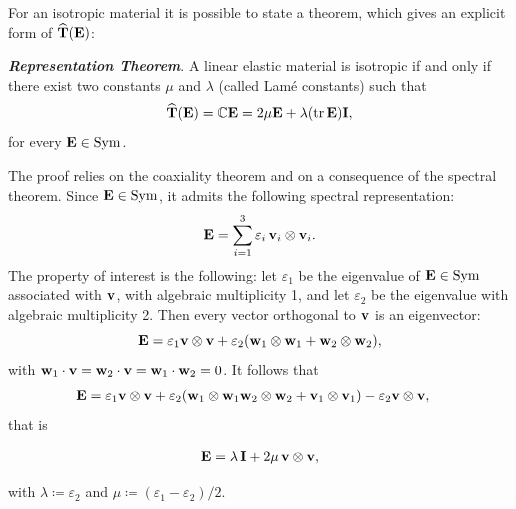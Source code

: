 For an isotropic material it is possible to state a theorem, which gives an explicit form of $\widehat{\mathbf{T}}(\mathbf{E})$:
\begin{definition}
 \textit{\textbf{Representation Theorem}}.	A linear elastic material is isotropic if and only if there exist two constants $\mu$ and $\lambda$ (called Lamé constants) such that
	\begin{equation}
		\widehat{\mathbf{T}}(\mathbf{E})=\mathbb{C} \mathbf{E} =2 \mu \mathbf{E} +\lambda(\operatorname{tr} \mathbf{E} )\mathbf{I},
	\end{equation}
	for every $\mathbf{E}\in\operatorname{Sym}$.
\end{definition}

The proof relies on the coaxiality theorem and on a consequence of the spectral theorem. Since $\mathbf{E}\in \operatorname{Sym}$, it admits the following spectral representation:
\begin{equation}\label{espettr}
	\mathbf{E}=\sum_{i=1}^{3}\varepsilon_i\, \mathbf{v}_i\otimes \mathbf{v}_i.
\end{equation}
The property of interest is the following: let $\varepsilon_1$ be the eigenvalue of $\mathbf{E}\in \operatorname{Sym}$ associated with $\mathbf{v}$, with algebraic multiplicity 1, and let $\varepsilon_2$ be the eigenvalue with algebraic multiplicity 2. Then every vector orthogonal to $\mathbf{v}$ is an eigenvector:
\begin{equation}
	\mathbf{E}=\varepsilon_1 \mathbf{v} \otimes \mathbf{v} + \varepsilon_2 (\mathbf{w}_1\otimes\mathbf{w}_1+\mathbf{w}_2\otimes\mathbf{w}_2),
\end{equation} 
with $\mathbf{w}_1\cdot\mathbf{v} = \mathbf{w}_2\cdot \mathbf{v}=\mathbf{w}_1\cdot\mathbf{w}_2=0$.
It follows that
\begin{equation}
	\begin{aligned}
		\mathbf{E} &=\varepsilon_1 \mathbf{v} \otimes \mathbf{v}+\varepsilon_2(\mathbf{w}_1\otimes\mathbf{w}_1\mathbf{w}_2\otimes\mathbf{w}_2+\mathbf{v}_1\otimes\mathbf{v}_1)-\varepsilon_2\mathbf{v} \otimes \mathbf{v},
	\end{aligned}
\end{equation}
that is 
\begin{definition}
	\begin{equation}\label{Evv}
		\begin{aligned}
			\mathbf{E}  =\lambda\, \mathbf{I} +2\mu \,\mathbf{v} \otimes \mathbf{v},
		\end{aligned}
	\end{equation}
\end{definition}
with $\lambda\coloneqq \varepsilon_2$ and $\mu\coloneqq(\varepsilon_1-\varepsilon_2)/2$.

\vspace{.3cm}

